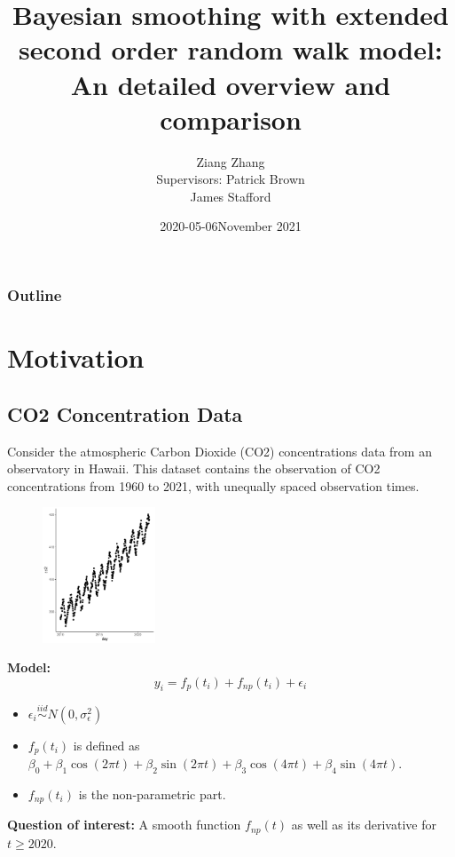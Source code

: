 \documentclass{beamer} %
\title{\textbf{Bayesian smoothing with extended second order random walk model: An detailed overview and comparison}}
\author{Ziang Zhang\\[5mm]{\small Supervisors: Patrick Brown \\ \hspace{18mm} James Stafford}}
\institute{Department of Statistics, University of Toronto}
\date{2020-05-06}
\date{November 2021}
\begin{document}
\begin{frame}
\titlepage
\end{frame}

\begin{frame}
\frametitle{Outline}
\tableofcontents
\end{frame}

\section{Motivation}

\subsection{CO2 Concentration Data}
\begin{frame}
Consider the atmospheric Carbon Dioxide (CO2) concentrations data from an observatory in Hawaii. This dataset contains the observation of CO2 concentrations from 1960 to 2021, with unequally spaced observation times. 

\begin{figure}[p]
      \includegraphics[width=0.3\textwidth]{co2_original_plot.pdf}
    \label{fig:co2_1}
\end{figure}
\end{frame}


\begin{frame}
\textbf{Model:} 
\pause
$$y_i = f_{p}(t_i) + f_{np}(t_i) + \epsilon_i$$

\begin{itemize}
\pause
\item  $\epsilon_i \overset{iid}\sim N(0,\sigma_\epsilon^2)$
\pause
\item $f_{p}(t_i)$ is defined as  
$ \beta_0 + \beta_1 \cos(2\pi t) + \beta_2 \sin(2 \pi t) + \beta_3 \cos(4\pi t) + \beta_4 \sin(4\pi t).$
\pause
\item $f_{np}(t_i)$ is the non-parametric part.
\end{itemize}

\pause
\textbf{Question of interest:} A smooth function $f_{np}(t)$ as well as its derivative for $t \geq 2020$.
\end{frame}
\end{document}
